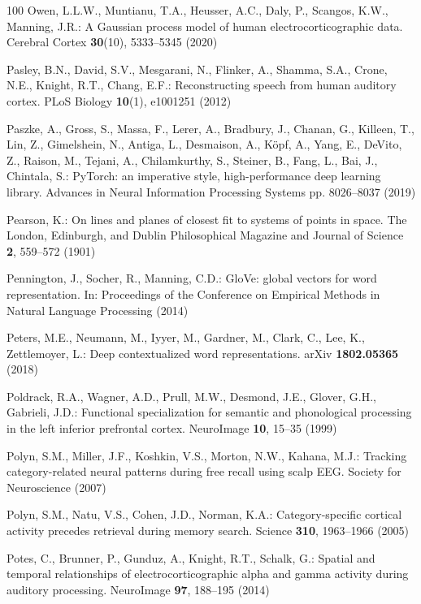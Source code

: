 \documentclass[runningheads]{llncs}
\begin{document}
\begin{thebibliography}{100}
Owen, L.L.W., Muntianu, T.A., Heusser, A.C., Daly, P., Scangos, K.W., Manning,
  J.R.: A {Gaussian} process model of human electrocorticographic data.
  Cerebral Cortex  \textbf{30}(10),  5333--5345 (2020)

Pasley, B.N., David, S.V., Mesgarani, N., Flinker, A., Shamma, S.A., Crone,
  N.E., Knight, R.T., Chang, E.F.: Reconstructing speech from human auditory
  cortex. {PLoS} Biology  \textbf{10}(1),  e1001251 (2012)

Paszke, A., Gross, S., Massa, F., Lerer, A., Bradbury, J., Chanan, G., Killeen,
  T., Lin, Z., Gimelshein, N., Antiga, L., Desmaison, A., K{\" o}pf, A., Yang,
  E., DeVito, Z., Raison, M., Tejani, A., Chilamkurthy, S., Steiner, B., Fang,
  L., Bai, J., Chintala, S.: {PyTorch}: an imperative style, high-performance
  deep learning library. Advances in Neural Information Processing Systems pp.
  8026--8037 (2019)

Pearson, K.: On lines and planes of closest fit to systems of points in space.
  The London, Edinburgh, and Dublin Philosophical Magazine and Journal of
  Science  \textbf{2},  559--572 (1901)

Pennington, J., Socher, R., Manning, C.D.: {GloVe}: global vectors for word
  representation. In: Proceedings of the Conference on Empirical Methods in
  Natural Language Processing (2014)

Peters, M.E., Neumann, M., Iyyer, M., Gardner, M., Clark, C., Lee, K.,
  Zettlemoyer, L.: Deep contextualized word representations. {arXiv}
  \textbf{1802.05365} (2018)

Poldrack, R.A., Wagner, A.D., Prull, M.W., Desmond, J.E., Glover, G.H.,
  Gabrieli, J.D.: Functional specialization for semantic and phonological
  processing in the left inferior prefrontal cortex. {NeuroImage}  \textbf{10},
   15--35 (1999)

Polyn, S.M., Miller, J.F., Koshkin, V.S., Morton, N.W., Kahana, M.J.: Tracking
  category-related neural patterns during free recall using scalp {EEG}.
  Society for Neuroscience (2007)

Polyn, S.M., Natu, V.S., Cohen, J.D., Norman, K.A.: Category-specific cortical
  activity precedes retrieval during memory search. Science  \textbf{310},
  1963--1966 (2005)

Potes, C., Brunner, P., Gunduz, A., Knight, R.T., Schalk, G.: Spatial and
  temporal relationships of electrocorticographic alpha and gamma activity
  during auditory processing. {NeuroImage}  \textbf{97},  188--195 (2014)


\end{thebibliography}
\end{document}
